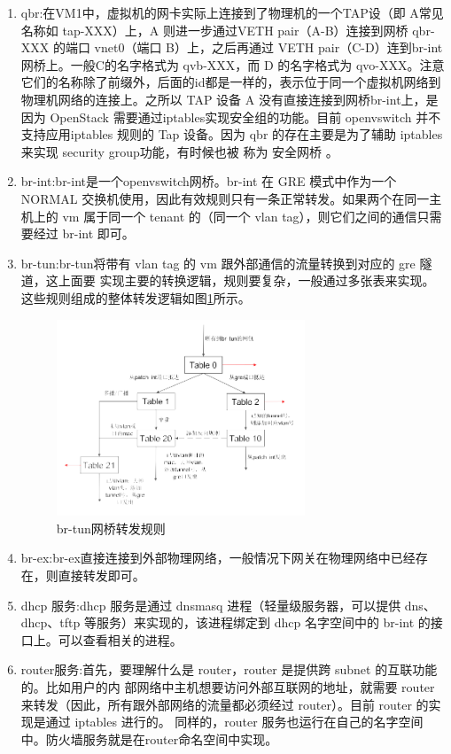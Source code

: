 \begin{enumerate}
\item qbr:在VM1中，虚拟机的网卡实际上连接到了物理机的一个TAP设（即 A常见名称如 tap-XXX）上，A 则进一步通过VETH pair（A-B）连接到网桥 qbr-XXX 的端口 vnet0（端口 B）上，之后再通过 VETH pair（C-D）连到br-int网桥上。一般C的名字格式为 qvb-XXX，而 D 的名字格式为 qvo-XXX。注意它们的名称除了前缀外，后面的id都是一样的，表示位于同一个虚拟机网络到物理机网络的连接上。之所以 TAP 设备 A 没有直接连接到网桥br-int上，是因为 OpenStack 需要通过iptables实现安全组的功能。目前 openvswitch 并不支持应用iptables 规则的 Tap 设备。因为 qbr 的存在主要是为了辅助 iptables 来实现 security group功能，有时候也被
称为 安全网桥 。
\item br-int:br-int是一个openvswitch网桥。br-int 在 GRE 模式中作为一个 NORMAL 交换机使用，因此有效规则只有一条正常转发。如果两个在同一主机上的 vm 属于同一个 tenant 的（同一个 vlan tag），则它们之间的通信只需要经过 br-int 即可。
\item br-tun:br-tun将带有 vlan tag 的 vm 跟外部通信的流量转换到对应的 gre 隧道，这上面要
实现主要的转换逻辑，规则要复杂，一般通过多张表来实现。这些规则组成的整体转发逻辑如图\ref{fig:br-tun}所示。

\begin{figure}[!htb]
  \centering
  \includegraphics[width=0.7\textwidth]{logo/br-tun.png}
  \caption{br-tun网桥转发规则}
  \label{fig:br-tun}
\end{figure}

\item br-ex:br-ex直接连接到外部物理网络，一般情况下网关在物理网络中已经存在，则直接转发即可。
\item dhcp 服务:dhcp 服务是通过 dnsmasq 进程（轻量级服务器，可以提供 dns、dhcp、tftp 等服务）来实现的，该进程绑定到 dhcp 名字空间中的 br-int 的接口上。可以查看相关的进程。
\item router服务:首先，要理解什么是 router，router 是提供跨 subnet 的互联功能的。比如用户的内
部网络中主机想要访问外部互联网的地址，就需要 router 来转发（因此，所有跟外部网络的流量都必须经过 router）。目前 router 的实现是通过 iptables 进行的。 同样的，router 服务也运行在自己的名字空间中。防火墙服务就是在router命名空间中实现。

\end{enumerate}

